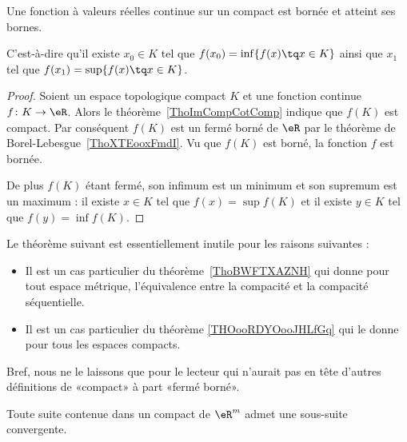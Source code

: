 \begin{theorem}\label{ThoMKKooAbHaro}
    Une fonction à valeurs réelles continue sur un compact est bornée et atteint ses bornes.

	C'est-à-dire qu'il existe $x_0\in K$ tel que $f(x_0)=\inf\{ f(x)\tq x\in K \}$ ainsi que $x_1$ tel que $f(x_1)=\sup\{ f(x)\tq x\in K \}$.
\end{theorem}

\begin{proof}
    Soient un espace topologique compact \( K\) et une fonction continue \( f\colon K\to \eR\). Alors le théorème~\ref{ThoImCompCotComp} indique que \( f(K)\) est compact. Par conséquent \( f(K)\) est un fermé borné de \( \eR\) par le théorème de Borel-Lebesgue~\ref{ThoXTEooxFmdI}. Vu que \( f(K)\) est borné, la fonction \( f\) est bornée.

    De plus \( f(K)\) étant fermé, son infimum est un minimum et son supremum est un maximum : il existe \( x\in K\) tel que \( f(x)=\sup f(K)\) et il existe \( y\in K\) tel que \( f(y)=\inf f(K)\).
\end{proof}

Le théorème suivant est essentiellement inutile pour les raisons suivantes :
\begin{itemize}
    \item 
        Il est un cas particulier du théorème~\ref{ThoBWFTXAZNH} qui donne pour tout espace métrique, l'équivalence entre la compacité et la compacité séquentielle.
    \item
        Il est un cas particulier du théorème \ref{THOooRDYOooJHLfGq} qui le donne pour tous les espaces compacts.
\end{itemize}
Bref, nous ne le laissons que pour le lecteur qui n'aurait pas en tête d'autres définitions de «compact» à part «fermé borné».

\begin{theorem}		\label{ThoBolzanoWeierstrassRn}
	Toute suite contenue dans un compact de \( \eR^m\) admet une sous-suite convergente.
\end{theorem}


